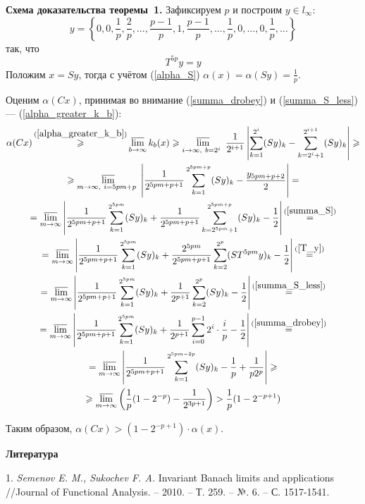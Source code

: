 \documentclass[10pt,pdf,hyperref={unicode}]{beamer}
\begin{document}
\textbf{Схема доказательства теоремы~1.}
Зафиксируем $p$ и построим $y\in l_\infty$:
\begin{equation*}\label{y_construction}
	y = \left\{
		0, 0, \frac{1}{p}, \frac{2}{p}, %
		...,
		\frac{p-1}{p}, 1, \frac{p-1}{p},
		...,
		\frac{1}{p},
		0, ..., 0,
		\frac{1}{p}, ...
	\right\}
\end{equation*}
так, что
\begin{equation}\label{T_y}
	T^{5p}y = y
\end{equation}
Положим $x = Sy$, тогда с учётом (\ref{alpha_S})
$
	\alpha (x) = \alpha (Sy) = \frac{1}{p}
$.

Оценим $\alpha(Cx)$, принимая во внимание (\ref{summa_drobey}) и (\ref{summa_S_less}) --- (\ref{alpha_greater_k_b}):
\begin{multline*}
	\alpha (Cx) \mathop{\geqslant}^{(\ref{alpha_greater_k_b})}
	\varlimsup_{b\to \infty} k_b(x) \geqslant
	\varlimsup_{
		i\to \infty,~
		b=2^i~
	}\frac{1}{2^{i+1}}\left|
		\sum_{k=1}^{2^i}(Sy)_k - \sum_{k=2^i+1}^{2^{i+1}}(Sy)_k
	\right| \geqslant
	\\ \geqslant
	\varlimsup_{
		m\to \infty,~
		i=5pm+p~
	}\left|
		\frac{1}{2^{5pm+p+1}}\sum_{k=1}^{2^{5pm+p}}(Sy)_k - \frac{y_{5pm+p+2}}{2}
	\right| =
	\\=
	\varlimsup_{m\to \infty}\left|
		\frac{1}{2^{5pm+p+1}}\sum_{k=1}^{2^{5pm}}(Sy)_k
		+
		\frac{1}{2^{5pm+p+1}}\sum_{k=2^{5pm}+1}^{2^{5pm+p}}(Sy)_k
		- \frac{1}{2}
	\right|
	\mathop{=}^{(\ref{summa_S})}
	\\=
	\varlimsup_{m\to \infty}\left|
		\frac{1}{2^{5pm+p+1}}\sum_{k=1}^{2^{5pm}}(Sy)_k
		+
		\frac{2^{5pm}}{2^{5pm+p+1}} \sum_{k=2}^{2^p}(ST^{5pm}y)_k
		- \frac{1}{2}
	\right|
	\mathop{=}^{(\ref{T_y})}
	\\=
	\varlimsup_{m\to \infty}\left|
		\frac{1}{2^{5pm+p+1}}\sum_{k=1}^{2^{5pm}}(Sy)_k
		+
		\frac{1}{2^{p+1}} \sum_{k=2}^{2^p}(Sy)_k
		- \frac{1}{2}
	\right|
	\mathop{=}^{(\ref{summa_S_less})}
	\\=
	\varlimsup_{m\to \infty}\left|
		\frac{1}{2^{5pm+p+1}}\sum_{k=1}^{2^{5pm}}(Sy)_k
		+
		\frac{1}{2^{p+1}} \sum_{i=0}^{p-1}2^i \cdot \frac{i}{p}
		- \frac{1}{2}
	\right|
	\mathop{=}^{(\ref{summa_drobey})}
	\\=
	\varlimsup_{m\to \infty}\left|
		\frac{1}{2^{5pm+p+1}}\sum_{k=1}^{2^{5pm-2p}}(Sy)_k
		-\frac{1}{p} + \frac{1}{p 2^p}
	\right| \geqslant
	\\ \geqslant
	\varlimsup_{m\to \infty} \left(
		\frac{1}{p} (1-2^{-p})
		- \frac{1}{2^{3p+1}}
	\right) >
	\frac{1}{p} (1-2^{-p+1})
\end{multline*}


Таким образом,
$
	\alpha(Cx) >
	(1-2^{-p+1}) \cdot \alpha(x)
$.

\smallskip \centerline{\bf Литература}\nopagebreak

1. {\it Semenov E. M., Sukochev F. A.}
 Invariant Banach limits and applications //Journal of Functional Analysis. – 2010. – Т. 259. – №. 6. – С. 1517-1541.
\end{document}

